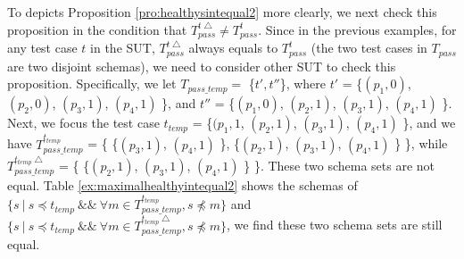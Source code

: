 To depicts Proposition \ref{pro:healthysintequal2} more clearly, we next check this proposition in the condition that $T_{pass}^{t\bigtriangleup} \neq T_{pass}^{t}$. Since in the previous examples, for any test case $t$ in the SUT,  $T_{pass}^{t\bigtriangleup}$ always equals to $T_{pass}^{t}$ (the two test cases in $T_{pass}$ are two disjoint schemas), we need to consider other SUT to check this proposition. Specifically, we let $T_{pass\_temp} =$ \{$ t' , t'' $\}, where $t'$ = \{$(p_{1}, 0)$, $(p_{2}, 0)$, $(p_{3}, 1)$, $(p_{4}, 1)$ \}, and $t''$ = \{$(p_{1}, 0)$, $(p_{2}, 1)$, $(p_{3}, 1)$, $(p_{4}, 1)$ \}.  Next, we focus the test case $t_{temp}$ = \{$(p_{1}, 1$, $(p_{2}, 1)$, $(p_{3}, 1)$, $(p_{4}, 1)$ \}, and we have $T_{pass\_temp}^{t_{temp}}$ = \{ \{$(p_{3}, 1)$, $(p_{4}, 1)$ \}, \{$(p_{2}, 1)$, $(p_{3}, 1)$, $(p_{4}, 1)$ \} \}, while $T_{pass\_temp}^{t_{temp}\bigtriangleup}$ = \{ \{$(p_{2}, 1)$, $(p_{3}, 1)$, $(p_{4}, 1)$ \} \}. These two schema sets are not equal. Table \ref{ex:maximalhealthyintequal2} shows the schemas of $\{ s\ |\ s \preceq t_{temp}\ \&\&\ \forall m \in T_{pass\_temp}^{t_{temp}}, s \npreceq m \}$ and $\{ s\ |\ s \preceq t_{temp}\ \&\&\ \forall m \in T_{pass\_temp}^{t_{temp}\bigtriangleup}, s \npreceq m \}$, we find these two schema sets are still equal.

